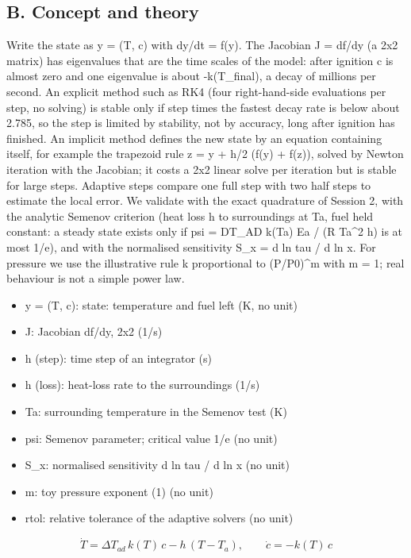 \documentclass[11pt,a4paper]{article}
\begin{document}
\subsection*{B. Concept and theory}
Write the state as y = (T, c) with dy/dt = f(y). The Jacobian J = df/dy (a 2x2 matrix) has eigenvalues that are the time scales of the model: after ignition c is almost zero and one eigenvalue is about -k(T\_final), a decay of millions per second. An explicit method such as RK4 (four right-hand-side evaluations per step, no solving) is stable only if step times the fastest decay rate is below about 2.785, so the step is limited by stability, not by accuracy, long after ignition has finished. An implicit method defines the new state by an equation containing itself, for example the trapezoid rule z = y + h/2 (f(y) + f(z)), solved by Newton iteration with the Jacobian; it costs a 2x2 linear solve per iteration but is stable for large steps. Adaptive steps compare one full step with two half steps to estimate the local error. We validate with the exact quadrature of Session 2, with the analytic Semenov criterion (heat loss h to surroundings at Ta, fuel held constant: a steady state exists only if psi = DT\_AD k(Ta) Ea / (R Ta\textasciicircum{}2 h) is at most 1/e), and with the normalised sensitivity S\_x = d ln tau / d ln x. For pressure we use the illustrative rule k proportional to (P/P0)\textasciicircum{}m with m = 1; real behaviour is not a simple power law.

\begin{itemize}[nosep]
\item y = (T, c): state: temperature and fuel left (K, no unit)
\item J: Jacobian df/dy, 2x2 (1/s)
\item h (step): time step of an integrator (s)
\item h (loss): heat-loss rate to the surroundings (1/s)
\item Ta: surrounding temperature in the Semenov test (K)
\item psi: Semenov parameter; critical value 1/e (no unit)
\item S\_x: normalised sensitivity d ln tau / d ln x (no unit)
\item m: toy pressure exponent (1) (no unit)
\item rtol: relative tolerance of the adaptive solvers (no unit)
\end{itemize}

\begin{equation*}
\dot T=\Delta T_{ad}\,k(T)\,c-h\,(T-T_a),\qquad \dot c=-k(T)\,c
\end{equation*}
\end{document}

